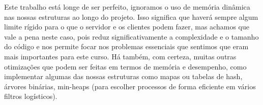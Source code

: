 \documentclass[a4paper]{report}
\begin{document}
	Este trabalho está longe de ser perfeito, ignoramos o uso de memória dinâmica nas nossas estruturas ao longo do projeto. Isso significa que haverá sempre algum limite rígido para o que o servidor e os clientes podem fazer, mas achamos que vale a pena neste caso, pois reduz significativamente a complexidade e o tamanho do código e nos permite focar nos problemas essenciais que sentimos que eram mais importantes para este curso. Há também, com certeza, muitas outras otimizações que podem ser feitas em termos de memória e desempenho, como implementar algumas das nossas estruturas como mapas ou tabelas de hash, árvores binárias, min-heaps (para escolher processos de forma eficiente em vários filtros logísticos). 
	
	
\end{document}
